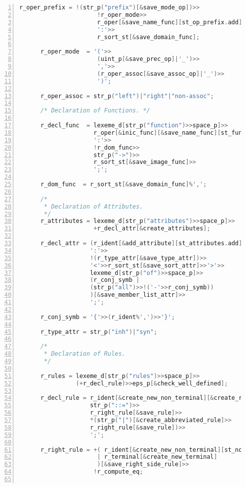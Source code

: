 \begin{lstlisting}[numbers=left,basicstyle=\tiny,language=C++,numberstyle=\tiny, numbersep=5pt]
      r_oper_prefix = !(str_p("prefix")[&save_mode_op])>>
                      !r_oper_mode>>
                      r_oper[&save_name_func][st_op_prefix.add]>>
                      ':'>>
                      r_sort_st[&save_domain_func];

      r_oper_mode  = '('>>
                      (uint_p[&save_prec_op]|'_')>>
                      ','>>
                      (r_oper_assoc[&save_assoc_op]|'_')>>
                      ')';

      r_oper_assoc = str_p("left")|"right"|"non-assoc";

      /* Declaration of Functions. */

      r_decl_func  = lexeme_d[str_p("function")>>space_p]>>
                     r_oper[&inic_func][&save_name_func][st_functions.add]>>
                     ':'>>
                     !r_dom_func>>
                     str_p("->")>>
                     r_sort_st[&save_image_func]>>
                     ';';

      r_dom_func  = r_sort_st[&save_domain_func]%',';

      /*
       * Declaration of Attributes.
       */
      r_attributes = lexeme_d[str_p("attributes")>>space_p]>>
                     +r_decl_attr[&create_attributes];

      r_decl_attr = (r_ident[&add_attribute][st_attributes.add]%',')>>
                    ':'>>
                    !(r_type_attr[&save_type_attr])>>
                    '<'>>r_sort_st[&save_sort_attr]>>'>'>>
                    lexeme_d[str_p("of")>>space_p]>>
                    (r_conj_symb |
                    (str_p("all")>>!('-'>>r_conj_symb))
                    )[&save_member_list_attr]>>
                    ';';

      r_conj_symb = '{'>>(r_ident%',')>>'}';

      r_type_attr = str_p("inh")|"syn";

      /*
       * Declaration of Rules.
       */

      r_rules = lexeme_d[str_p("rules")>>space_p]>>
                (+r_decl_rule)>>eps_p[&check_well_defined];

      r_decl_rule = r_ident[&create_new_non_terminal][&create_rule][st_non_terminal.add]>>
                    str_p("::=")>>
                    r_right_rule[&save_rule]>>
                    *(str_p("|")[&create_abbreviated_rule]>>
                    r_right_rule[&save_rule])>>
                    ';';

      r_right_rule = +( r_ident[&create_new_non_terminal][st_non_terminal.add]
                      | r_terminal[&create_new_terminal]
                      )[&save_right_side_rule]>>
                     !r_compute_eq;


\end{lstlisting}
